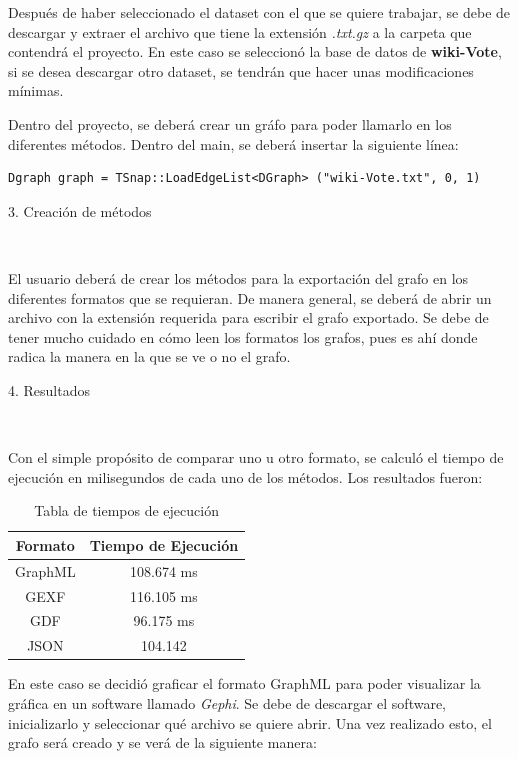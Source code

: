 \documentclass[12pt, letterpaper, twocolumn]{article}
\begin{document}
Después de haber seleccionado el dataset con el que se quiere trabajar, se debe de descargar y extraer el archivo que tiene la extensión \textit{.txt.gz} a la carpeta que contendrá el proyecto. En este caso se seleccionó la base de datos de \textbf{wiki-Vote}, si se desea descargar otro dataset, se tendrán que hacer unas modificaciones mínimas.

Dentro del proyecto, se deberá crear un gráfo para poder llamarlo en los diferentes métodos. Dentro del main, se deberá insertar la siguiente línea: 
\begin{lstlisting}
Dgraph graph = TSnap::LoadEdgeList<DGraph> ("wiki-Vote.txt", 0, 1)
\end{lstlisting}

\begin{description}
\item[{3. Creación de métodos}]~
\end{description}

El usuario deberá de crear los métodos para la exportación del grafo en los diferentes formatos que se requieran. De manera general, se deberá de abrir un archivo con la extensión requerida para escribir el grafo exportado. Se debe de tener mucho cuidado en cómo leen los formatos los grafos, pues es ahí donde radica la manera en la que se ve o no el grafo. 

\begin{description}
\item[{4. Resultados}]~
\end{description}

Con el simple propósito de comparar uno u otro formato, se calculó el tiempo de ejecución en milisegundos de cada uno de los métodos. Los resultados fueron: 

\begin{table}[ht]
\center
\begin{tabular}{ |c| c| }
\hline
	\textbf{Formato} & \textbf{Tiempo de Ejecución} \\ 
\hline
	GraphML & 108.674 ms \\  
\hline
	GEXF & 116.105 ms \\
\hline
	GDF & 96.175 ms \\
\hline
	JSON & 104.142 \\
\hline
\end{tabular}

\caption{Tabla de tiempos de ejecución}
\label{table:1}
\end{table}

En este caso se decidió graficar el formato GraphML para poder visualizar la gráfica en un software llamado \textit{Gephi}. Se debe de descargar el software, inicializarlo y seleccionar qué archivo se quiere abrir. Una vez realizado esto, el grafo será creado y se verá de la siguiente manera:
\end{document}
